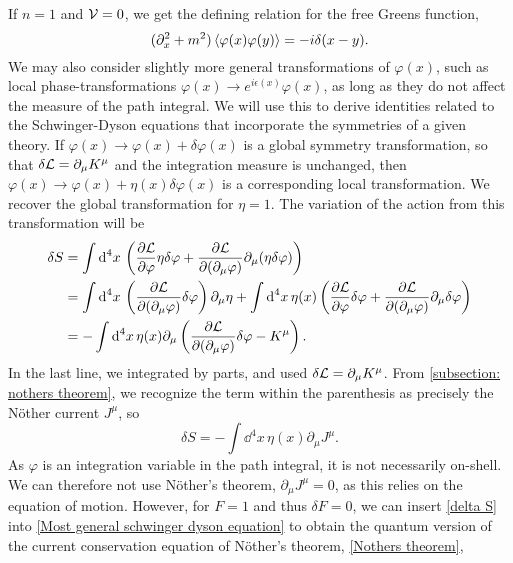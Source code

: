 %
If $n = 1$ and $\mathcal{V} = 0$, we get the defining relation for the free Greens function,
%
\begin{equation}
    (\partial^2_x + m^2)\braket{\varphi(x)\varphi(y)}
    = -i \delta(x - y).
\end{equation}
%
We may also consider slightly more general transformations of $\varphi(x)$, such as local phase-transformations $\varphi(x) \rightarrow e^{i\epsilon(x)}\varphi(x)$, as long as they do not affect the measure of the path integral.
We will use this to derive identities related to the Schwinger-Dyson equations that incorporate the symmetries of a given theory.
If $\varphi(x) \rightarrow \varphi(x) + \delta \varphi(x)$ is a global symmetry transformation, so that $\delta \mathcal{L} = \partial_\mu K^\mu$ and the integration measure is unchanged, then $\varphi(x) \rightarrow \varphi(x) + \eta(x) \delta \varphi(x)$ is a corresponding local transformation.
We recover the global transformation for $\eta = 1$.
The variation of the action from this transformation will be
%
\begin{align}
    \nonumber
    \delta S 
    &= 
    \int \text{d}^4 x \,
    \left(
        \pdv{\mathcal{L}}{\varphi} \eta \delta \varphi
        + \pdv{\mathcal{L}}{(\partial_\mu\varphi) } \partial_\mu (\eta \delta \varphi)
    \right)\\
    \nonumber
    & =
    \int \text{d}^4 x \, \left( \pdv{\mathcal{L}}{(\partial_\mu \varphi)} \delta \varphi \right) \partial_\mu \eta
    + \int \text{d}^4 x \, \eta(x)
    \left( 
        \pdv{\mathcal{L}}{\varphi} \delta \varphi 
        + \pdv{\mathcal{L}}{(\partial_\mu \varphi)} \partial_\mu \delta \varphi  
    \right)\\
    \nonumber
    &=
    - \int \text{d}^4 x \, \eta(x) \partial_\mu 
    \left(  \pdv{\mathcal{L}}{(\partial_\mu \varphi)} \delta \varphi - K^\mu \right).
\end{align}
%
In the last line, we integrated by parts, and used $\delta \mathcal{L} = \partial_\mu K^\mu$.
From \autoref{subsection: nothers theorem}, we recognize the term within the parenthesis as precisely the Nöther current $J^\mu$, so
%
\begin{equation}
    \label{delta S} 
    \delta S = - \int \dd^4 x \, \eta(x) \partial_\mu J^\mu.
\end{equation}
%
As $\varphi$ is an integration variable in the path integral, it is not necessarily on-shell.
We can therefore not use Nöther's theorem, $\partial_\mu J^\mu = 0$, as this relies on the equation of motion.
However, for $F = 1$ and thus $\delta F = 0$, we can insert \autoref{delta S} into \autoref{Most general schwinger dyson equation} to obtain the quantum version of the current conservation equation of Nöther's theorem, \autoref{Nothers theorem},

